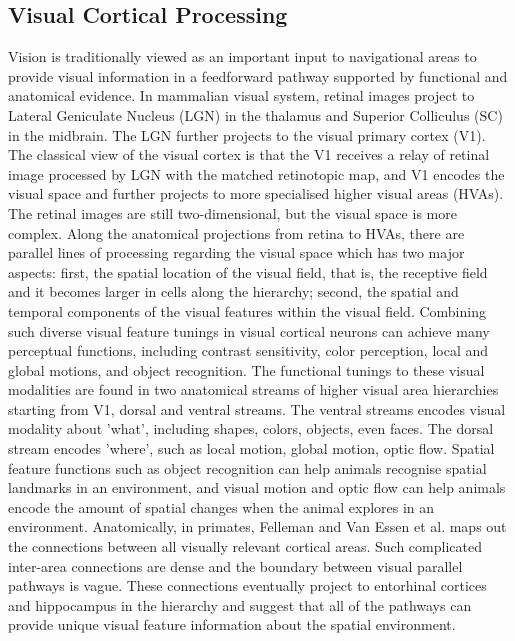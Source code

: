 \subsection{Visual Cortical Processing}
Vision is traditionally viewed as an important input to navigational areas to provide visual information in a feedforward pathway supported by functional and anatomical evidence. In mammalian visual system,  retinal images project to Lateral Geniculate Nucleus (LGN) in the thalamus and Superior Colliculus (SC) in the midbrain. The LGN further projects to the visual primary cortex (V1). The classical view of the visual cortex is that the V1 receives a relay of retinal image processed by LGN with the matched retinotopic map, and V1 encodes the visual space and further projects to more specialised higher visual areas (HVAs). The retinal images are still two-dimensional, but the visual space is more complex. Along the anatomical projections from retina to HVAs, there are parallel lines of processing regarding the visual space which has two major aspects: first, the spatial location of the visual field, that is, the receptive field and it becomes larger in cells along the hierarchy; second, the spatial and temporal components of the visual features within the visual field. Combining such diverse visual feature tunings in visual cortical neurons can achieve many perceptual functions, including contrast sensitivity, color perception, local and global motions, and object recognition. The functional tunings to these visual modalities are found in two anatomical streams of higher visual area hierarchies starting from V1, dorsal and ventral streams. The ventral streams encodes visual modality about 'what', including shapes, colors, objects, even faces. The dorsal stream encodes 'where', such as local motion, global motion, optic flow. Spatial feature functions such as object recognition can help animals recognise spatial landmarks in an environment, and visual motion and optic flow can help animals encode the amount of spatial changes when the animal explores in an environment. Anatomically, in primates, Felleman and Van Essen et al. maps out the connections between all visually relevant cortical areas. Such complicated inter-area connections are dense and the boundary between visual parallel pathways is vague. These connections eventually project to entorhinal cortices and hippocampus in the hierarchy and suggest that all of the pathways can provide unique visual feature information about the spatial environment. 

